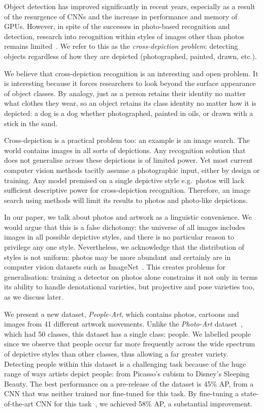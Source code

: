 \documentclass[runningheads]{llncs}
\begin{document}
Object detection has improved significantly in recent years, especially as a result of the resurgence of \acp{CNN} and the increase in performance and memory of GPUs.
However, in spite of the successes in photo-based recognition and detection, research into recognition within styles of images other than \acp{photo} remains limited~\cite{hall2015cross}.
We refer to this as the \textit{cross-depiction problem}: detecting objects regardless of how they are depicted (photographed, painted, drawn, etc.).

We believe that cross-depiction recognition is an interesting and open problem.
It is interesting because it forces researchers to look beyond the surface appearance of object classes.
By analogy, just as a person retains their identity no matter what clothes they wear, so an object retains its class identity no matter how it is depicted:
a dog is a dog whether photographed, painted in oils, or drawn with a stick in the sand.

Cross-depiction is a practical problem too: an example is an image search.
The world contains images in all sorts of depictions.
Any recognition solution that does not generalise across these depictions is of limited power.
Yet most current computer vision methods tacitly assume a photographic input, either by design or training.
Any model premised on a single depictive style e.g.\ \acp{photo} will lack sufficient descriptive power for cross-depiction recognition.
Therefore, an image search using methods will limit its results to \acp{photo} and photo-like depictions.

In our paper, we talk about \acfp{photo} and \ac{artwork} as a linguistic convenience.
We would argue that this is a false dichotomy: the universe of all images includes images in all possible depictive styles, and there is no particular reason to privilege any one style.
Nevertheless, we acknowledge that the distribution of styles is not uniform: \acp{photo} may be more abundant and certainly are in computer vision datasets such as ImageNet~\cite{deng2009imagenet}.
This creates problems for generalisation: training a detector on \acp{photo} alone constrains it not only in terms its ability to handle denotational varieties, but projective and pose varieties too, as we discuss later.

We present a new dataset, \emph{People-Art}, which contains \acp{photo}, cartoons and images from 41 different \ac{artwork} movements.
Unlike the \emph{Photo-Art} dataset~\cite{wu2014learning}, which had 50 classes, this dataset has a single class: people.
We labelled people since we observe that people occur far more frequently across the wide spectrum of depictive styles than other classes, thus allowing a far greater variety.
Detecting people within this dataset is a challenging task because of the huge range of ways artists depict people: from Picasso's cubism to Disney's Sleeping Beauty.
The best performance on a pre-release of the dataset is 45\% \ac{AP}, from a \ac{CNN} that was neither trained nor fine-tuned for this task.
By fine-tuning a state-of-the-art \ac{CNN} for this task~\cite{girshick2015fast}, we achieved 58\% \ac{AP}, a substantial improvement.
\end{document}
